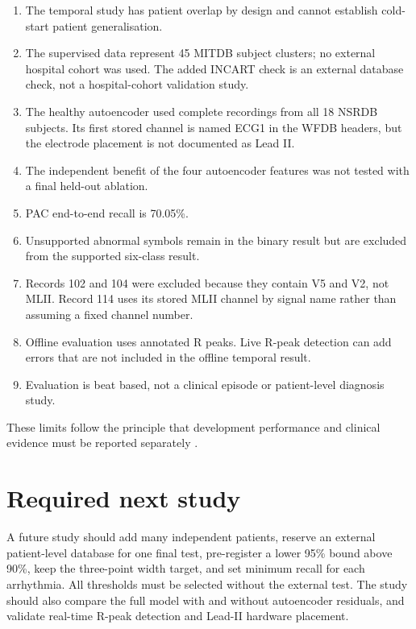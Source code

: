 \begin{enumerate}
    \item The temporal study has patient overlap by design and cannot establish
    cold-start patient generalisation.
    \item The supervised data represent 45 MITDB subject clusters; no external
    hospital cohort was used. The added INCART check is an external database
    check, not a hospital-cohort validation study.
    \item The healthy autoencoder used complete recordings from all 18 NSRDB
    subjects. Its first stored channel is named ECG1 in the WFDB headers, but
    the electrode placement is not documented as Lead II.
    \item The independent benefit of the four autoencoder features was not
    tested with a final held-out ablation.
    \item PAC end-to-end recall is 70.05\%.
    \item Unsupported abnormal symbols remain in the binary result but are
    excluded from the supported six-class result.
    \item Records 102 and 104 were excluded because they contain V5 and V2,
    not MLII. Record 114 uses its stored MLII channel by signal name rather
    than assuming a fixed channel number.
    \item Offline evaluation uses annotated R peaks. Live R-peak detection can
    add errors that are not included in the offline temporal result.
    \item Evaluation is beat based, not a clinical episode or patient-level
    diagnosis study.
\end{enumerate}

These limits follow the principle that development performance and clinical
evidence must be reported separately \cite{collins2024tripodai}.

\section{Required next study}

A future study should add many independent patients, reserve an external
patient-level database for one final test, pre-register a lower 95\% bound
above 90\%, keep the three-point width target, and set minimum recall for each
arrhythmia. All thresholds must be selected without the external test. The
study should also compare the full model with and without autoencoder
residuals, and validate real-time R-peak detection and Lead-II hardware
placement.

